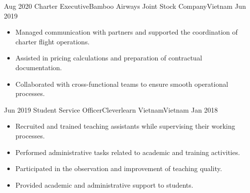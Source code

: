 \begin{experiences}
  \emptySeparator

  \experience
    {Aug 2020}
    {Charter Executive}{Bamboo Airways Joint Stock Company}{Vietnam}
    {Jun 2019}
    {
      \begin{itemize}
        \item Managed communication with partners and supported the coordination of charter flight operations.
        \item Assisted in pricing calculations and preparation of contractual documentation.
        \item Collaborated with cross-functional teams to ensure smooth operational processes.
      \end{itemize}
    }
    {}

  \emptySeparator

  \experience
    {Jun 2019}
    {Student Service Officer}{Cleverlearn Vietnam}{Vietnam}
    {Jan 2018}
    {
      \begin{itemize}
        \item Recruited and trained teaching assistants while supervising their working processes.
        \item Performed administrative tasks related to academic and training activities.
        \item Participated in the observation and improvement of teaching quality.
        \item Provided academic and administrative support to students.
      \end{itemize}
    }
    {}

\end{experiences}